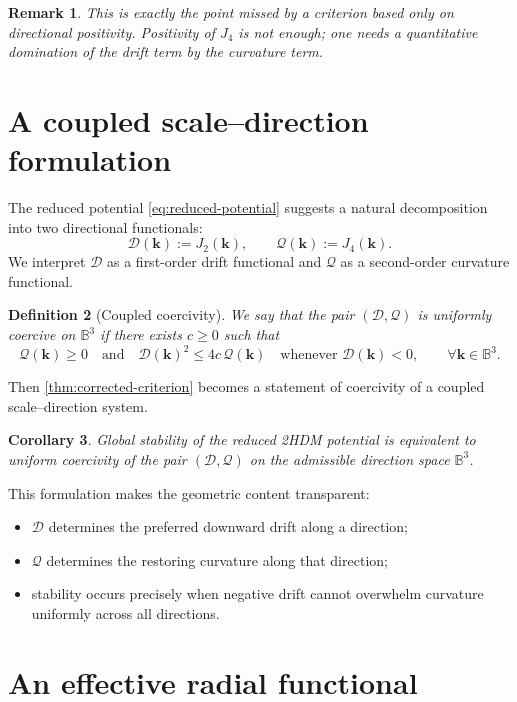 \documentclass[11pt,a4paper]{article}
\newtheorem{definition}{Definition}[section]
\newtheorem{corollary}[definition]{Corollary}
\newtheorem{remark}[definition]{Remark}
\newcommand{\kk}{\bm{k}}
\newcommand{\D}{\mathcal{D}}
\newcommand{\Q}{\mathcal{Q}}
\newcommand{\Sphere}{\mathbb{B}^3}
\begin{document}
	\begin{remark}
		This is exactly the point missed by a criterion based only on directional positivity. Positivity of \(J_4\) is not enough; one needs a quantitative domination of the drift term by the curvature term.
	\end{remark}
	
	\section{A coupled scale--direction formulation}
	
	The reduced potential \eqref{eq:reduced-potential} suggests a natural decomposition into two directional functionals:
	\[
	\D(\kk):=J_2(\kk),\qquad \Q(\kk):=J_4(\kk).
	\]
	We interpret \(\D\) as a first-order drift functional and \(\Q\) as a second-order curvature functional.
	
	\begin{definition}[Coupled coercivity]
		We say that the pair \((\D,\Q)\) is \emph{uniformly coercive on \(\Sphere\)} if there exists \(c\ge 0\) such that
		\begin{equation}\label{eq:uniform-coercivity}
			\Q(\kk)\ge 0
			\quad\text{and}\quad
			\D(\kk)^2\le 4c\,\Q(\kk)
			\quad\text{whenever }\D(\kk)<0,
			\qquad \forall \kk\in\Sphere.
		\end{equation}
	\end{definition}
	
	Then \cref{thm:corrected-criterion} becomes a statement of coercivity of a coupled scale--direction system.
	
	\begin{corollary}\label{cor:coercive-formulation}
		Global stability of the reduced 2HDM potential is equivalent to uniform coercivity of the pair \((\D,\Q)\) on the admissible direction space \(\Sphere\).
	\end{corollary}
	
	This formulation makes the geometric content transparent:
	\begin{itemize}
		\item \(\D\) determines the preferred downward drift along a direction;
		\item \(\Q\) determines the restoring curvature along that direction;
		\item stability occurs precisely when negative drift cannot overwhelm curvature uniformly across all directions.
	\end{itemize}
	
	\section{An effective radial functional}
	
\end{document}
